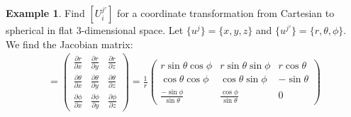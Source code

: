 \documentclass{book}
\theoremstyle{definition}
\newtheorem{exmp}{Example}[section]
\begin{document}
\begin{exmp}
	Find $[U^{j'}_i]$ for a coordinate transformation from Cartesian to spherical in flat 3-dimensional space. Let $\{u^j\} = \{ x,y,z\}$ and $\{u^{j'} \} = \{ r, \theta, \phi\} $. We find the Jacobian matrix:
	\begin{align*}
	[U^{j'}_i] = 
	\begin{pmatrix}
	\frac{\partial r}{\partial x} & \frac{\partial r}{\partial y} & \frac{\partial r}{\partial z}\\
	\frac{\partial \theta}{\partial x} & \frac{\partial \theta}{\partial y} & \frac{\partial \theta}{\partial z}\\
	\frac{\partial \phi}{\partial x} & \frac{\partial \phi}{\partial y} & \frac{\partial \phi}{\partial z}
	\end{pmatrix}
	=\frac{1}{r}
	\begin{pmatrix}
	r\sin\theta\cos\phi & r\sin\theta\sin\phi & r\cos\theta\\
	\cos\theta\cos\phi & \cos\theta\sin\phi & -\sin\theta\\
	\frac{-\sin\phi}{\sin\theta} & \frac{\cos\phi}{\sin\theta} & 0
	\end{pmatrix}
	\end{align*}
\end{exmp}
\end{document}
